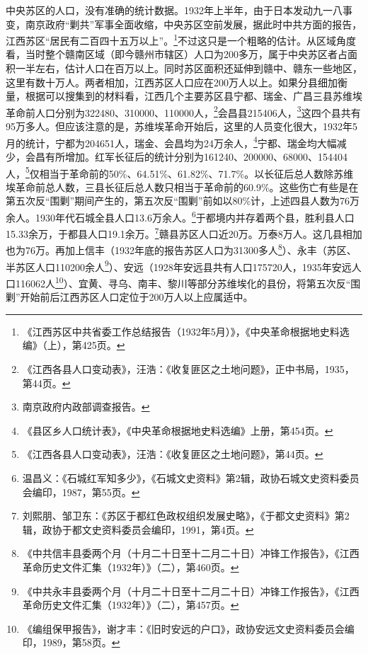 中央苏区的人口，没有准确的统计数据。1932年上半年，由于日本发动九一八事变，南京政府“剿共”军事全面收缩，中央苏区空前发展，据此时中共方面的报告，江西苏区“居民有二百四十五万以上”。\footnote{《江西苏区中共省委工作总结报告（1932年5月）》，《中央革命根据地史料选编》（上），第425页。}不过这只是一个粗略的估计。从区域角度看，当时整个赣南区域（即今赣州市辖区）人口为200多万，属于中央苏区者占面积一半左右，估计人口在百万以上。同时苏区面积还延伸到赣中、赣东一些地区，这里有数十万人。两者相加，江西苏区人口应在200万人以上。如果分县细加衡量，根据可以搜集到的材料看，江西几个主要苏区县宁都、瑞金、广昌三县苏维埃革命前人口分别为322480、310000、110000人，\footnote{《江西各县人口变动表》，汪浩：《收复匪区之土地问题》，正中书局，1935，第44页。}会昌县215406人，\footnote{南京政府内政部调查报告。}这四个县共有95万多人。但应该注意的是，苏维埃革命开始后，这里的人员变化很大，1932年5月的统计，宁都为204651人，瑞金、会昌均为24万余人，\footnote{《县区乡人口统计表》，《中央革命根据地史料选编》上册，第454页。}宁都、瑞金均大幅减少，会昌有所增加。红军长征后的统计分别为161240、200000、68000、154404人，\footnote{《江西各县人口变动表》，汪浩：《收复匪区之土地问题》，第44页。}仅相当于革命前的50\%、64.51\%、61.82\%、71.7\%。以长征后总人数除苏维埃革命前总人数，三县长征后总人数只相当于革命前的60.9\%。这些伤亡有些是在第五次反“围剿”期间产生的，第五次反“围剿”前如以80\%计，上述四县人数为76万余人。1930年代石城全县人口13.6万余人。\footnote{温昌义：《石城红军知多少》，《石城文史资料》第2辑，政协石城文史资料委员会编印，1987，第55页。}于都境内并存着两个县，胜利县人口15.33余万，于都县人口19.1余万。\footnote{刘熙朋、邹卫东：《苏区于都红色政权组织发展史略》，《于都文史资料》第2辑，政协于都文史资料委员会编印，1991，第4页。}赣县苏区人口近20万。万泰8万人。这几县相加也为76万。再加上信丰（1932年底的报告苏区人口为31300多人\footnote{《中共信丰县委两个月（十月二十日至十二月二十日）冲锋工作报告》，《江西革命历史文件汇集（1932年）》（二），第460页。}）、永丰（苏区、半苏区人口110200余人\footnote{《中共永丰县委两个月（十月二十日至十二月二十日）冲锋工作报告》，《江西革命历史文件汇集（1932年）》（二），第457页。}）、安远（1928年安远县共有人口175720人，1935年安远人口116062人\footnote{《编组保甲报告》，谢才丰：《旧时安远的户口》，政协安远文史资料委员会编印，1989，第58页。}）、宜黄、寻乌、南丰、黎川等部分苏维埃化的县份，将第五次反“围剿”开始前后江西苏区人口定位于200万人以上应属适中。



